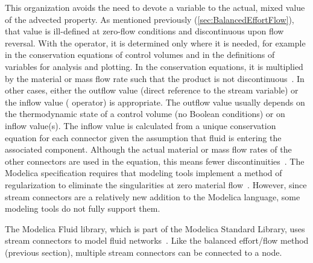 This organization avoids the need to devote a variable to the actual, mixed value of the advected property.  As mentioned previously (\autoref{sec:BalancedEffortFlow}), that value is ill-defined at zero-flow conditions and discontinuous upon flow reversal.  With the  operator, it is determined only where it is needed, for example in the conservation equations of control volumes and in the definitions of variables for analysis and plotting.  In the conservation equations, it is multiplied by the material or mass flow rate such that the product is not discontinuous~\cite{Modelica3.3}.  In other cases, either the outflow value (direct reference to the stream variable) or the inflow value ( operator) is appropriate.  The outflow value usually depends on the thermodynamic state of a control volume (no Boolean conditions) or on inflow value(s).  The inflow value is calculated from a unique conservation equation for each connector given the assumption that fluid is entering the associated component.  Although the actual material or mass flow rates of the other connectors are used in the equation, this means fewer discontinuities~\cite{Franke2009}.  The Modelica specification requires that modeling tools implement a method of regularization to eliminate the singularities at zero material flow~\cite{Modelica3.3}.  However, since stream connectors are a relatively new addition to the Modelica language, some modeling tools do not fully support them.

The Modelica Fluid library, which is part of the Modelica Standard Library, uses stream connectors to model  fluid networks~\cite{ModelicaSL3.2}.  Like the balanced effort\slash{}flow method (previous section), multiple stream connectors can be connected to a node.  

